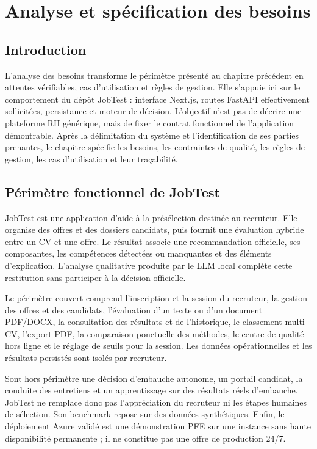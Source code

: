 \chapter{Analyse et spécification des besoins}

\section*{Introduction}
L'analyse des besoins transforme le périmètre présenté au chapitre précédent en attentes vérifiables, cas d'utilisation et règles de gestion. Elle s'appuie ici sur le comportement du dépôt JobTest : interface Next.js, routes FastAPI effectivement sollicitées, persistance et moteur de décision. L'objectif n'est pas de décrire une plateforme RH générique, mais de fixer le contrat fonctionnel de l'application démontrable. Après la délimitation du système et l'identification de ses parties prenantes, le chapitre spécifie les besoins, les contraintes de qualité, les règles de gestion, les cas d'utilisation et leur traçabilité.

\section{Périmètre fonctionnel de JobTest}
JobTest est une application d'aide à la présélection destinée au recruteur. Elle organise des offres et des dossiers candidats, puis fournit une évaluation hybride entre un CV et une offre. Le résultat associe une recommandation officielle, ses composantes, les compétences détectées ou manquantes et des éléments d'explication. L'analyse qualitative produite par le LLM local complète cette restitution sans participer à la décision officielle.

Le périmètre couvert comprend l'inscription et la session du recruteur, la gestion des offres et des candidats, l'évaluation d'un texte ou d'un document PDF/DOCX, la consultation des résultats et de l'historique, le classement multi-CV, l'export PDF, la comparaison ponctuelle des méthodes, le centre de qualité hors ligne et le réglage de seuils pour la session. Les données opérationnelles et les résultats persistés sont isolés par recruteur.

Sont hors périmètre une décision d'embauche autonome, un portail candidat, la conduite des entretiens et un apprentissage sur des résultats réels d'embauche. JobTest ne remplace donc pas l'appréciation du recruteur ni les étapes humaines de sélection. Son benchmark repose sur des données synthétiques. Enfin, le déploiement Azure validé est une démonstration PFE sur une instance sans haute disponibilité permanente ; il ne constitue pas une offre de production 24/7.

